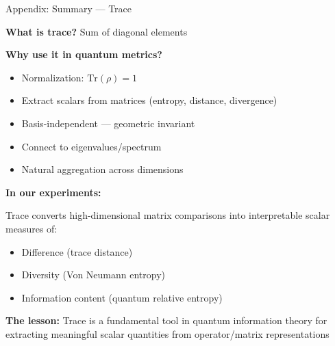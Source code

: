 \documentclass[aspectratio=169,11pt]{beamer}
\begin{document}
\begin{frame}{Appendix: Summary — Trace}

\textbf{What is trace?} Sum of diagonal elements

\vspace{0.5em}

\textbf{Why use it in quantum metrics?}
\begin{itemize}
  \item Normalization: $\text{Tr}(\rho) = 1$
  \item Extract scalars from matrices (entropy, distance, divergence)
  \item Basis-independent — geometric invariant
  \item Connect to eigenvalues/spectrum
  \item Natural aggregation across dimensions
\end{itemize}

\vspace{0.5em}

\textbf{In our experiments:}

Trace converts high-dimensional matrix comparisons into interpretable scalar measures of:
\begin{itemize}
  \item Difference (trace distance)
  \item Diversity (Von Neumann entropy)
  \item Information content (quantum relative entropy)
\end{itemize}

\vspace{0.5em}

\textbf{The lesson:} Trace is a fundamental tool in quantum information theory for extracting meaningful scalar quantities from operator/matrix representations

\end{frame}
\end{document}
